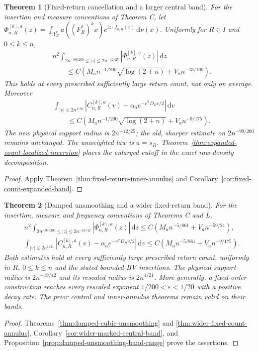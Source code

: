 \documentclass[11pt,reqno]{amsart}
\numberwithin{equation}{section}
\newtheorem{maintheorem}{Theorem}
\theoremstyle{definition}\newtheorem{definition}[theorem]{Definition}
\theoremstyle{remark}\newtheorem{remark}[theorem]{Remark}
\newcommand{\dd}{\,\mathrm d}\newcommand{\one}{\mathbf1}
\begin{document}
\begin{maintheorem}[Fixed-return cancellation and a larger central band]
\label{thm:intro-fixed-return-annulus}
For the insertion and measure conventions of Theorem C, let
$\Phi^{[k],a}_{n,R}(z)=\int_{Y_R^*}a((F_R^*)^kx)e^{iz\cdot J_{n,R}(x)}\dd\nu(x)$.
Uniformly for $R\in I$ and $0\le k\le n$,
\begin{align*}
 &n^2\int_{2n^{-99/200}\le|z|\le2n^{-12/25}}
                    |\Phi^{[k],a}_{n,R}(z)|\dd z\\
 &\qquad\le C\left(M_an^{-1/200}\sqrt{\log(2+n)}+V_an^{-13/100}\right).
\end{align*}
This holds at every prescribed sufficiently large return count, not
only on average. Moreover
\begin{align*}
 &\int_{|v|\le2n^{1/50}}
 |C^{[k],a}_{n,R}(v)-\alpha_a e^{-v^{\mathsf T}D_Rv/2}|\dd v\\
 &\qquad\le C\left(M_an^{-1/200}\sqrt{\log(2+n)}+V_an^{-9/175}\right).
\end{align*}
The new physical support radius is $2n^{-12/25}$; the old,
sharper estimate on $2n^{-99/200}$ remains unchanged. The unweighted
law is $a=s_R$. Theorem~\ref{thm:expanded-count-localized-inversion}
places the enlarged cutoff in the exact raw-density decomposition.
\end{maintheorem}
\begin{proof}
Apply Theorem~\ref{thm:fixed-return-inner-annulus} and
Corollary~\ref{cor:fixed-count-expanded-band}.
\end{proof}

\begin{maintheorem}[Damped unsmoothing and a wider fixed-return band]
\label{thm:intro-damped-unsmoothing}
For the insertion, measure and frequency conventions of Theorems C and L,
\begin{align*}
 &n^2\int_{2n^{-99/200}\le|z|\le2n^{-19/42}}
          |\Phi^{[k],a}_{n,R}(z)|\dd z
        \le C\left(M_an^{-5/861}+V_an^{-59/21}\right),\\
 &\int_{|v|\le2n^{1/21}}
   \left|C^{[k],a}_{n,R}(v)-\alpha_a e^{-v^{\mathsf T}D_Rv/2}\right|\dd v
        \le C\left(M_an^{-5/861}+V_an^{-9/175}\right).
\end{align*}
Both estimates hold at every sufficiently large prescribed return count,
uniformly in $R$, $0\le k\le n$ and the stated bounded-BV insertions.
The physical support radius is $2n^{-19/42}$ and its rescaled radius is
$2n^{1/21}$. More generally, a fixed-order construction reaches every
rescaled exponent $1/200<\varepsilon<1/20$ with a positive decay rate.
The prior central and inner-annulus theorems remain valid on their bands.
\end{maintheorem}
\begin{proof}
Theorems~\ref{thm:damped-cubic-unsmoothing} and
\ref{thm:wider-fixed-count-annulus},
Corollary~\ref{cor:wider-marked-central-band}, and
Proposition~\ref{prop:damped-unsmoothing-band-range} prove the assertions.
\end{proof}
\end{document}

